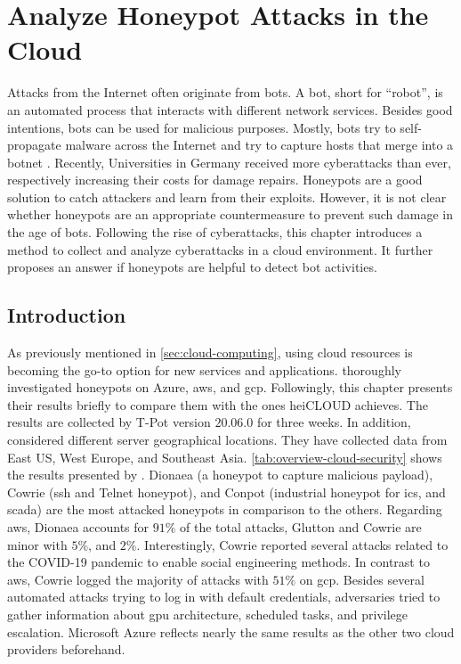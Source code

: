 \chapter{Analyze Honeypot Attacks in the Cloud}
\label{chap:cloud-security}

Attacks from the Internet often originate from bots.
A bot, short for \enquote{robot}, is an automated process that interacts with different network services.
Besides good intentions, bots can be used for malicious purposes.
Mostly, bots try to self-propagate malware across the Internet and try to capture hosts that merge into a botnet \cite{Feily2009}.
Recently, Universities in Germany received more cyberattacks than ever, respectively increasing their costs for damage repairs.
Honeypots are a good solution to catch attackers and learn from their exploits.
However, it is not clear whether honeypots are an appropriate countermeasure to prevent such damage in the age of bots.
Following the rise of cyberattacks, this chapter introduces a method to collect and analyze cyberattacks in a cloud environment.
It further proposes an answer if honeypots are helpful to detect bot activities.

\section{Introduction}

As previously mentioned in \autoref{sec:cloud-computing}, using cloud resources is becoming the go-to option for new services and applications.
\citet{Kelly2021} thoroughly investigated honeypots on Azure, \ac{aws}, and \ac{gcp}.
Followingly, this chapter presents their results briefly to compare them with the ones heiCLOUD achieves.
The results are collected by T-Pot version $20.06.0$ for three weeks.
In addition, \citet{Kelly2021} considered different server geographical locations.
They have collected data from East US, West Europe, and Southeast Asia.
\autoref{tab:overview-cloud-security} shows the results presented by \citet{Kelly2021}.
Dionaea (a honeypot to capture malicious payload), Cowrie (\ac{ssh} and Telnet honeypot), and Conpot (industrial honeypot for \ac{ics}, and \ac{scada}) are the most attacked honeypots in comparison to the others.
Regarding \ac{aws}, Dionaea accounts for $91\%$ of the total attacks, Glutton and Cowrie are minor with $5\%$, and $2\%$.
Interestingly, Cowrie reported several attacks related to the COVID-19 pandemic to enable social engineering methods.
In contrast to \ac{aws}, Cowrie logged the majority of attacks with $51\%$ on \ac{gcp}.
Besides several automated attacks trying to log in with default credentials, adversaries tried to gather information about \ac{gpu} architecture, scheduled tasks, and privilege escalation.
Microsoft Azure reflects nearly the same results as the other two cloud providers beforehand.

